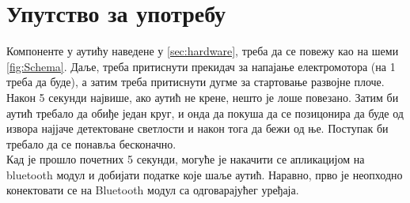 
\chapter{Упутство за употребу}

Компоненте у аутићу наведене у \ref{sec:hardware}, треба да се повежу као на шеми \ref{fig:Schema}. Даље, треба притиснути прекидач за напајање електромотора (на 1 треба да буде), а затим треба притиснути дугме за стартовање развојне плоче. Након 5 секунди највише, ако аутић не крене, нешто је лоше повезано. Затим би аутић требало да обиђе један круг, и онда да покуша да се позицонира да буде од извора најјаче детектоване светлости и након тога да бежи 
од ње. Поступак би требало да се понавља бесконачно.
\\
\indent Кад је прошло почетних 5 секунди, могуће је накачити се апликацијом \cite{BluetoothTerminal} на bluetooth модул и добијати податке које шаље аутић. Наравно, прво је неопходно конектовати се на Bluetooth модул са одговарајућег уређаја.